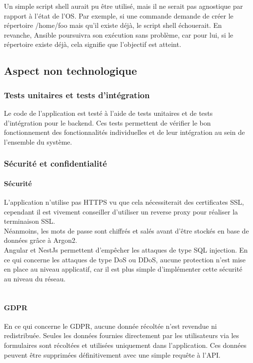 Un simple script shell aurait pu être utilisé, mais il ne serait pas agnostique par rapport à l'état de l'OS\@.
Par exemple, si une commande demande de créer le répertoire /home/foo mais qu'il existe déjà, le script shell échouerait.
En revanche, Ansible poursuivra son exécution sans problème, car pour lui, si le répertoire existe déjà, cela signifie que l'objectif est atteint.

\subsection{Aspect non technologique}\label{subsec:aspect-non-technologique}

\subsubsection{Tests unitaires et tests d'intégration}

Le code de l'application est testé à l'aide de tests unitaires et de tests d'intégration pour le backend.
Ces tests permettent de vérifier le bon fonctionnement des fonctionnalités individuelles et de leur intégration au sein de l'ensemble du système.

\subsubsection{Sécurité et confidentialité}

\paragraph{Sécurité}
L'application n'utilise pas HTTPS vu que cela nécessiterait des certificates SSL, cependant il est vivement conseiller d'utiliser un reverse proxy pour réaliser la terminaison SSL.\\
Néanmoins, les mots de passe sont chiffrés et salés avant d'être stockés en base de données grâce à Argon2.\\
Angular et NestJs permettent d'empêcher les attaques de type SQL injection.
En ce qui concerne les attaques de type DoS ou DDoS, aucune protection n'est mise en place au niveau applicatif, car il est plus simple d'implémenter cette sécurité au niveau du réseau.\\\\

\paragraph{GDPR}
En ce qui concerne le GDPR, aucune donnée récoltée n'est revendue ni redistribuée.
Seules les données fournies directement par les utilisateurs via les formulaires sont récoltées et utilisées uniquement dans l'application.
Ces données peuvent être supprimées définitivement avec une simple requête à l'API.

